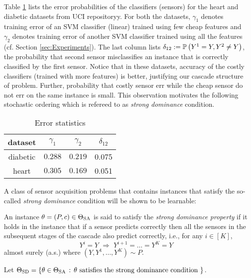 Table \ref{tab:ErrorTable1} lists the error probabilities of the classifiers (sensors) for the heart and diabetic datasets from UCI repositoryy. For both the datasets, $\gamma_1$ denotes training error of an SVM classifier (linear) trained using few cheap features and $\gamma_2$ denotes training error of another SVM classifier trained using all the features (cf. Section \ref{sec:Experiments}). The last column lists $\delta_{12}:=\mathbb{P}\left(Y^1=Y, Y^2\neq Y\right)$, the probability that second sensor misclassifies an instance that is correctly classified by the first sensor. Notice that in these datasets, accuracy of the costly classifiers (trained with more features) is better, justifying our cascade structure of problem. Further, probability that costly sensor err while the cheap sensor do not err on the same instance is small. This observation motivates the following stochastic ordering which is refereed to as {\em strong dominance} condition. 
\begin{table}
\begin{center}
\begin{tabular}[c]{c|c|c|c } 
dataset & $\gamma_1$ & $\gamma_2$ & $\delta_{12}$\\ \hline \hline
diabetic & $0.288 $ & $ 0.219$  & 0.075\\  \hline
heart & $0.305$ & $0.169$ &  0.051\\  \hline
\end{tabular}
\label{tab:ErrorTable1}
\caption{Error statistics}
\end{center}
\end{table}

A class of sensor acquisition problems that contains instances that satisfy the so-called \emph{strong dominance} condition 
will be shown to be learnable:
\begin{defi}
	An instance $\theta = (P,c)\in \Theta_{\mathrm{SA}}$  is said to satisfy the \emph{strong dominance property} if 
	it holds in the instance that if a sensor predicts correctly
	then all the sensors in the subsequent stages of the cascade also predict correctly, i.e., 
	for any $i\in [K]$,
	\begin{equation}
	\label{eqn:DominanceCondition}
	Y^i=Y \,\, \Rightarrow\,\, Y^{i+1}= \dots =  Y^K = Y
	\end{equation}
	almost surely (a.s.)
	where $(Y,Y^1,\dots,Y^K)\sim P$.
\end{defi}
Let $\Theta_{\mathrm{SD}} = \{ \theta\in \Theta_{\mathrm{SA}}\,:\, \theta \text{ satisfies the strong dominance condition } \}$.

